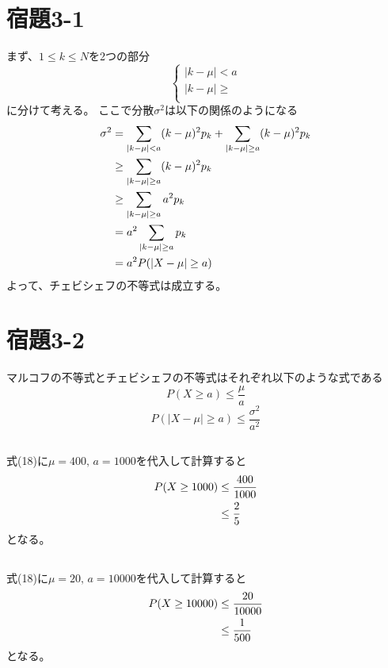 \documentclass{jsarticle}
\begin{document}
    \section{宿題3-1}
    まず、$1\le k\le N$を2つの部分
    \begin{equation}
      \left\{
      \begin{array}{l}
        |k-\mu| < a \\
        |k-\mu| \ge \\
      \end{array}
      \right.
    \end{equation}
    に分けて考える。
    ここで分散${\sigma}^2$は以下の関係のようになる
    \begin{align}
      {\sigma}^2
      &= \sum_{|k-\mu| < a} (k-\mu)^2 p_k + \sum_{|k-\mu| \ge a} (k-\mu)^2 p_k \notag \\
      &\ge \sum_{|k-\mu| \ge a} (k-\mu)^2 p_k \notag \\
      &\ge \sum_{|k-\mu| \ge a} a^2 p_k \notag \\
      &= a^2\sum_{|k-\mu| \ge a} p_k \notag \\
      &= a^2 P(|X-\mu| \ge a)
    \end{align}
    よって、チェビシェフの不等式は成立する。

    \section{宿題3-2}
    マルコフの不等式とチェビシェフの不等式はそれぞれ以下のような式である
    \begin{equation}
      P(X \ge a)\le \frac{\mu}{a}
    \end{equation}
    \begin{equation}
      P(|X-\mu| \ge a)\le \frac{{\sigma}^2}{a^2}
    \end{equation}

    \subsection{}
    式(18)に$\mu = 400,\, a=1000$を代入して計算すると
    \begin{align}
      P(X \ge 1000) &\le \frac{400}{1000} \notag \\
      &\le \frac{2}{5}
    \end{align}
    となる。

    \subsection{}
    式(18)に$\mu = 20,\, a=10000$を代入して計算すると
    \begin{align}
      P(X \ge 10000) &\le \frac{20}{10000} \notag \\
      &\le \frac{1}{500}
    \end{align}
    となる。
\end{document}
